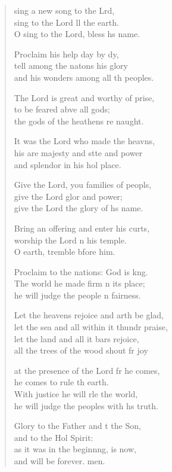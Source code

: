 \settowidth{\versewidth}{let the sea and all within it thunder praise,}
\begin{verse}%
  \begin{patverse}
 sing a new song to the Lrd,\Flex\\
sing to the Lord ll the earth.\Med\\
O sing to the Lord, bless h\pointup{\i}s name.

Proclaim his help day by dy,\Flex\\
tell among the nat\pointup{\i}ons his glory\Med\\
and his wonders among all th peoples.

The Lord is great and worthy of prise,\Flex\\
to be feared abve all gods;\Med\\
the gods of the heathens re naught.

It was the Lord who made the heavns,\Flex\\
his are majesty and stte and power\Med\\
and splendor in his hol place.

Give the Lord, you families of peopls,\Flex\\
give the Lord glor and power;\Med\\
give the Lord the glory of h\pointup{\i}s name.

Bring an offering and enter his curts,\Flex\\
worship the Lord \pointup{\i}n his temple.\Med\\
O earth, tremble bfore him.

Proclaim to the nations: God is k\pointup{\i}ng.\Flex\\
The world he made firm \pointup{\i}n its place;\Med\\
he will judge the people \pointup{\i}n fairness.

Let the heavens rejoice and arth be glad,\Med\\
let the sea and all within it thundr praise,\\
let the land and all it bars rejoice,\Med\\
all the trees of the wood shout fr joy

at the presence of the Lord fr he comes,\Med\\
he comes to rule th earth.\\
With justice he will rle the world,\Med\\
he will judge the peoples with h\pointup{\i}s truth.

Glory to the Father and t the Son,\Med\\
and to the Hol Spirit:\\
as it was in the beginn\pointup{\i}ng, is now,\Med\\
and will be forever. men. 
  \end{patverse}
\end{verse}
